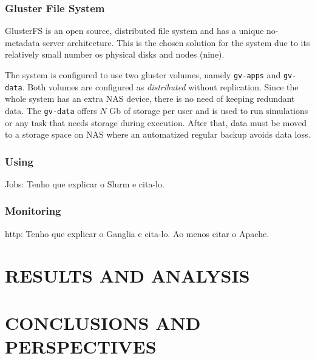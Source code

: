 \documentclass[twoside,a4paper,12pt,english]{inac19}
\begin{document}
\subsubsection{Gluster File System}

GlusterFS\cite{gluster} is an open source, distributed file system and has
a unique no-metadata server architecture. This is the chosen solution for the system due to its relatively
small number os physical disks and nodes (nine).

The system is configured to use two gluster volumes, namely \texttt{gv-apps} and \texttt{gv-data}. Both volumes
are configured as \textit{distributed} without replication. Since the whole system has an extra NAS device, there is
no need of keeping redundant data. The \texttt{gv-data} offers $N$ Gb of storage per user and is used to run simulations or any task that needs storage during execution. After that, data must be moved to a storage space on NAS where an automatized regular backup avoids data loss.

\subsubsection{Using}
\label{ssec:slurm}

Jobs: Tenho que explicar o Slurm\cite{slurm} e cita-lo.

\subsubsection{Monitoring}
\label{ssec:ganglia}

http: Tenho que explicar o Ganglia\cite{ganglia} e cita-lo. Ao menos citar o Apache\cite{apache}.


\section{RESULTS AND ANALYSIS}


\section{CONCLUSIONS AND PERSPECTIVES}
\end{document}
